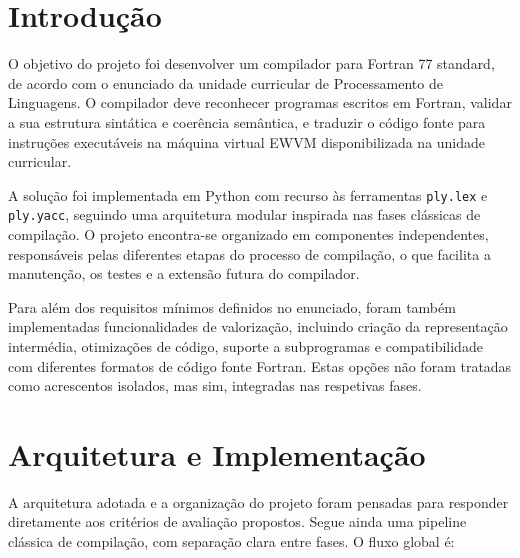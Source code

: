 \documentclass[11pt,a4paper]{report}
\begin{document}
\newpage

\section{Introdução}

O objetivo do projeto foi desenvolver um compilador para Fortran 77 standard, de acordo com o enunciado da unidade curricular de Processamento de Linguagens. O compilador deve reconhecer programas escritos em Fortran, validar a sua estrutura sintática e coerência semântica, e traduzir o código fonte para instruções executáveis na máquina virtual EWVM disponibilizada na unidade curricular.

A solução foi implementada em Python com recurso às ferramentas \texttt{ply.lex} e \texttt{ply.yacc}, seguindo uma arquitetura modular inspirada nas fases clássicas de compilação. O projeto encontra-se organizado em componentes independentes, responsáveis pelas diferentes etapas do processo de compilação, o que facilita a manutenção, os testes e a extensão futura do compilador.

Para além dos requisitos mínimos definidos no enunciado, foram também implementadas funcionalidades de valorização, incluindo criação da representação intermédia, otimizações de código, suporte a subprogramas e compatibilidade com diferentes formatos de código fonte Fortran. Estas opções não foram tratadas como acrescentos isolados, mas sim, integradas nas respetivas fases.

\section{Arquitetura e Implementação}

A arquitetura adotada e a organização do projeto foram pensadas para responder diretamente aos critérios de avaliação propostos. Segue ainda uma pipeline clássica de compilação, com separação clara entre fases. O fluxo global é:
\end{document}
